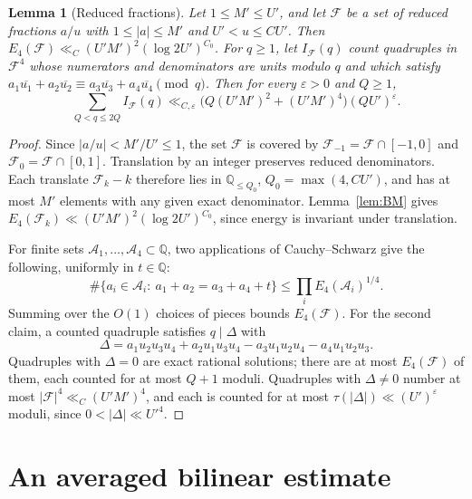 \documentclass[11pt]{amsart}
\newtheorem{lemma}[theorem]{Lemma}
\theoremstyle{definition}
\theoremstyle{remark}
\numberwithin{equation}{section}
\newcommand{\Q}{\mathbb Q}
\newcommand{\cF}{\mathcal F}
\newcommand{\eps}{\varepsilon}
\newcommand{\inv}[1]{\overline{#1}}
\begin{document}
\begin{lemma}[Reduced fractions]\label{lem:energy-fractions}
Let $1\le M'\le U'$, and let $\cF$ be a set of reduced fractions $a/u$ with
$1\le|a|\le M'$ and $U'<u\le CU'$.  Then
$E_4(\cF)\ll_C(U'M')^2(\log 2U')^{C_0}$.  For $q\ge1$, let $I_\cF(q)$ count
quadruples in $\cF^4$ whose numerators and denominators are units modulo
$q$ and which satisfy
$a_1\inv{u_1}+a_2\inv{u_2}\equiv a_3\inv{u_3}+a_4\inv{u_4}\pmod q$.  Then
for every $\eps>0$ and $Q\ge1$,
\[
 \sum_{Q<q\le2Q}I_\cF(q)\ll_{C,\eps}
 \bigl(Q(U'M')^2+(U'M')^4\bigr)(QU')^{\eps}.
\]
\end{lemma}

\begin{proof}
Since $|a/u|<M'/U'\le1$, the set $\cF$ is covered by
$\cF_{-1}=\cF\cap[-1,0]$ and $\cF_0=\cF\cap[0,1]$.  Translation by an
integer preserves reduced denominators.  Each translate $\cF_k-k$ therefore
lies in $\Q_{\le Q_0}$, $Q_0=\max(4,CU')$, and has at most $M'$ elements
with any given exact denominator.  Lemma~\ref{lem:BM} gives
$E_4(\cF_k)\ll(U'M')^2(\log 2U')^{C_0}$, since energy is invariant under
translation.

For finite sets $\mathcal A_1,\dots,\mathcal A_4\subset\Q$, two
applications of Cauchy--Schwarz give the following, uniformly in
$t\in\Q$:
\[
 \#\{a_i\in\mathcal A_i:\ a_1+a_2=a_3+a_4+t\}
 \le\prod_i E_4(\mathcal A_i)^{1/4}.
\]
Summing over the $O(1)$ choices of pieces bounds $E_4(\cF)$.  For the second
claim, a counted quadruple satisfies $q\mid\Delta$ with
\[
 \Delta=a_1u_2u_3u_4+a_2u_1u_3u_4-a_3u_1u_2u_4-a_4u_1u_2u_3 .
\]
Quadruples with $\Delta=0$ are exact rational solutions; there are at most
$E_4(\cF)$ of them, each counted for at most $Q+1$ moduli.  Quadruples with
$\Delta\neq0$ number at most $|\cF|^4\ll_C(U'M')^4$, and each is counted for
at most $\tau(|\Delta|)\ll(U')^{\eps}$ moduli, since $0<|\Delta|\ll U'^4$.
\end{proof}

\section{An averaged bilinear estimate}\label{sec:bilinear}
\end{document}
